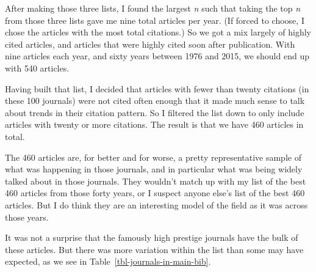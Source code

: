 \documentclass[
  10pt,
  letterpaper,
  DIV=11,
  numbers=noendperiod,
  twoside]{scrartcl}
\begin{document}
After making those three lists, I found the largest \emph{n} such that
taking the top \emph{n} from those three lists gave me nine total
articles per year. (If forced to choose, I chose the articles with the
most total citations.) So we got a mix largely of highly cited articles,
and articles that were highly cited soon after publication. With nine
articles each year, and sixty years between 1976 and 2015, we should end
up with 540 articles.

Having built that list, I decided that articles with fewer than twenty
citations (in these 100 journals) were not cited often enough that it
made much sense to talk about trends in their citation pattern. So I
filtered the list down to only include articles with twenty or more
citations. The result is that we have 460 articles in total.

The 460 articles are, for better and for worse, a pretty representative
sample of what was happening in those journals, and in particular what
was being widely talked about in those journals. They wouldn't match up
with my list of the best 460 articles from those forty years, or I
suspect anyone else's list of the best 460 articles. But I do think they
are an interesting model of the field as it was across those years.

It was not a surprise that the famously high prestige journals have the
bulk of these articles. But there was more variation within the list
than some may have expected, as we see in
Table~\ref{tbl-journals-in-main-bib}.
\end{document}
